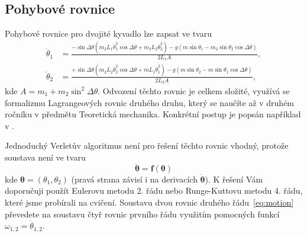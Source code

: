 \documentclass{article}
\begin{document}
    \subsection{Pohybové rovnice}
    Pohybové rovnice pro dvojité kyvadlo lze zapsat ve tvaru
    \begin{subequations}
        \begin{align}
            \ddot{\theta}_1 &= \frac{-\sin{\Delta\theta}\left(m_{2}L_1\dot{\theta}_1^2\cos{\Delta\theta}+m_{2}L_{2}\dot{\theta}_2^2\right)
                -g\left(m\sin{\theta_1}-m_2\sin{\theta_{2}}\cos{\Delta\theta}\right)}{2L_{1}A},\\
            \ddot{\theta}_2 &= \frac{+\sin{\Delta\theta}\left(m_{2}L_2\dot{\theta}_2^2\cos{\Delta\theta}+m L_{1}\dot{\theta}_1^2\right)
                -g\left(m\sin{\theta_2}-m\sin{\theta_{1}}\cos{\Delta\theta}\right)}{2L_{2}A},
        \end{align}
        \label{eq:motion}            
    \end{subequations}
    kde $A=m_{1}+m_{2}\sin^2{\Delta\theta}$.
    Odvození těchto rovnic je celkem složité, využívá se formalizmu Lagrangeových rovnic druhého druhu, který se naučíte až v druhém ročníku v předmětu Teoretická mechanika.
    Konkrétní postup je popsán například v \cite{DP}.
    
    Jednoduchý Verletův algoritmus není pro řešení těchto rovnic vhodný, proto\-že soustava není ve tvaru 
    \begin{equation}
        \ddot{\boldsymbol{\theta}}={\boldsymbol{f}}(\boldsymbol{\theta})
    \end{equation}
    kde $\boldsymbol{\theta}=(\theta_1,\theta_2)$ (pravá strana závisí i na derivacích $\dot{\boldsymbol{\theta}}$).
    K řešení Vám doporučuji použít Eulerovu metodu 2. řádu nebo Runge-Kuttovu metodu 4. řádu, které jsme probírali na cvičení.
    Soustavu dvou rovnic druhého řádu~\eqref{eq:motion} převedete na soustavu čtyř rovnic prvního řádu využitím pomocných funkcí $\omega_{1,2}=\dot{\theta}_{1,2}$.
\end{document}
